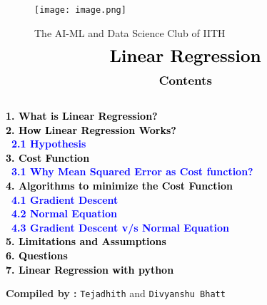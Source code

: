 \documentclass{homework}
\begin{document}
\begin{center}
\begin{figure}[h]
\centering
\texttt{[image: image.png]}
\caption*{{{\selectfont The AI-ML and Data Science Club of IITH}}}
\end{figure}
\end{center}
\begin{align*}
{\LARGE{\textbf{Linear Regression}}}
\end{align*}
\graphicspath{{./media/}}
\begin{align*}
\large{\textbf{{Contents}}}
\end{align*}
{\textcolor{black}{\textbf{
 \\
 1. {What is Linear Regression?}\\
 2. {How Linear Regression Works?}\\
\indent \    \textcolor{blue}{2.1 Hypothesis}\\
 3. {Cost Function}\\
\indent \  \textcolor{blue}{3.1 Why Mean Squared Error as Cost function?}\\
 4. {Algorithms to minimize the Cost Function}\\
\textcolor{blue}{\indent \    4.1 Gradient Descent\\
\indent  \   4.2 Normal Equation\\
\indent  \   4.3 Gradient Descent v/s Normal Equation}\\
5. {Limitations and Assumptions}\\
6. {Questions}\\
7. {Linear Regression with python}\\}}}
\begin{center}
    {\textbf{Compiled by :}
    \texttt{Tejadhith} and \texttt{Divyanshu Bhatt}}
\end{center}

\newpage
\end{document}
